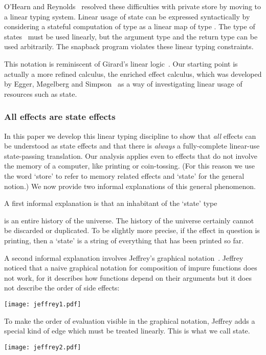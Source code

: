 \documentclass{LMCS}
\begin{document}
O'Hearn and Reynolds~\cite{OHearn:R:00}
resolved these difficulties with private store
by moving to a linear typing system.
Linear usage of state can be expressed syntactically 
by considering a stateful computation of
type  as a linear map of type .  The type of states~
must be used linearly, but the argument type  and the return type 
can be used arbitrarily. 
The snapback program violates these linear typing constraints.

This notation is reminiscent of Girard's linear
logic~\cite{DBLP:journals/tcs/Girard87}.  Our starting point is
actually a more refined calculus, the enriched effect calculus, which
was developed by Egger, M\o gelberg and
Simpson~\cite{EEC:journal,Mogelberg:CSL:09,Mogelberg:fossacs:10,EEC:LCPS:journal} as a
way of investigating linear usage of resources such as state.

\subsubsection*{All effects are state effects}
In this paper we develop this linear typing discipline to show that
\emph{all} effects can be understood as state effects and that there
is \emph{always} a fully-complete linear-use state-passing
translation.  Our analysis applies even to effects that do not involve
the memory of a computer, like printing or coin-tossing.  (For this
reason we use the word `store' to refer to memory related effects and
`state' for the general notion.)  We now provide two informal
explanations of this general phenomenon.

A first informal explanation is that an inhabitant of the `state' type 
 
is an entire history of the universe. The history of the universe 
certainly cannot be discarded or duplicated. 
To be slightly more precise, if the effect in question is 
printing, then a `state' is a string of everything that has been printed
so far. 

A second informal explanation involves Jeffrey's 
graphical notation~\cite{jeffrey-premonoidal-graphics}.
Jeffrey noticed that a naive graphical notation for 
composition of impure functions does not work,
for it describes how functions depend on their arguments 
but it does not describe the order of side effects:
\\
\begin{center}
\texttt{[image: jeffrey1.pdf]}
\end{center}
To make the 
order of evaluation visible in the graphical notation, 
Jeffrey adds a special kind of edge which must be treated linearly.
This is what we call state.
\\
\begin{center}
\texttt{[image: jeffrey2.pdf]}
\end{center}
\end{document}
